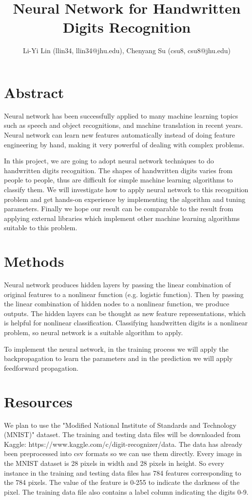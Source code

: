 \documentclass[11pt]{article}
\title{Neural Network for Handwritten Digits Recognition}
\author{Li-Yi Lin (llin34, llin34@jhu.edu), Chenyang Su (csu8, csu8@jhu.edu)}
\date{}
\begin{document}
\maketitle

\section{Abstract}
Neural network has been successfully applied to many machine learning topics such as speech and object recognitions, and machine translation in recent years. Neural network can learn new features automatically instead of doing feature engineering by hand, making it very powerful of dealing with complex problems. 

In this project, we are going to adopt neural network techniques to do handwritten digits recognition. The shapes of handwritten digits varies from people to people, thus are difficult for simple machine learning algorithms to classify them. We will investigate how to apply neural network to this recognition problem and get hands-on experience by implementing the algorithm and tuning parameters. Finally we hope our result can be comparable to the result from applying external libraries which implement other machine learning algorithms suitable to this problem. 

\section{Methods}
Neural network produces hidden layers by passing the linear combination of original features to a nonlinear function (e.g. logistic function). Then by passing the linear combination of hidden nodes to a nonlinear function, we produce outputs. The hidden layers can be thought as new feature representations, which is helpful for nonlinear classification. Classifying handwritten digits is a nonlinear problem, so neural network is a suitable algorithm to apply. 

To implement the neural network, in the training process we will apply the backpropagation to learn the parameters and in the prediction we will apply feedforward propagation. 

\section{Resources}
We plan to use the "Modified National Institute of Standards and Technology (MNIST)" dataset. The training and testing data files will be downloaded from Kaggle: https://www.kaggle.com/c/digit-recognizer/data. The data has already been preprocessed into csv formats so we can use them directly. Every image in the MNIST dataset is 28 pixels in width and 28 pixels in height. So every instance in the training and testing data files has 784 features corresponding to the 784 pixels. The value of the feature is 0-255 to indicate the darkness of the pixel. The training data file also contains a label column indicating the digits 0-9. 
\end{document}
